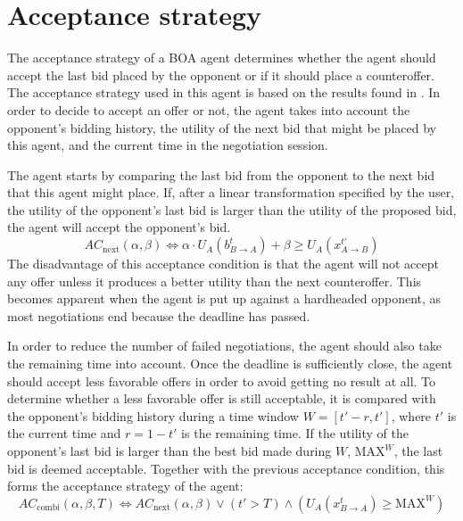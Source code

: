 \section{Acceptance strategy}

%
%
%

The acceptance strategy of a BOA agent determines whether the agent should accept the last bid placed by the opponent or if it should place a counteroffer.
The acceptance strategy used in this agent is based on the results found in \cite{ASarticle}.
In order to decide to accept an offer or not, the agent takes into account the opponent's bidding history, the utility of the next bid that might be placed by this agent, and the current time in the negotiation session.

The agent starts by comparing the last bid from the opponent to the next bid that this agent might place.
If, after a linear transformation specified by the user, the utility of the opponent's last bid is larger than the utility of the proposed bid, the agent will accept the opponent's bid.
$$
AC_\mathrm{next}(\alpha,\beta) \Leftrightarrow \alpha \cdot U_A(b^t_{B\rightarrow A}) + \beta \geq U_A(x^{t'}_{A\rightarrow B})
$$
The disadvantage of this acceptance condition is that the agent will not accept any offer unless it produces a better utility than the next counteroffer.
This becomes apparent when the agent is put up against a hardheaded opponent, as most negotiations end because the deadline has passed.

In order to reduce the number of failed negotiations, the agent should also take the remaining time into account.
Once the deadline is sufficiently close, the agent should accept less favorable offers in order to avoid getting no result at all.
To determine whether a less favorable offer is still acceptable, it is compared with the opponent's bidding history during a time window $W=[t'-r, t']$, where $t'$ is the current time and $r=1-t'$ is the remaining time.
If the utility of the opponent's last bid is larger than the best bid made during $W$, $\mathrm{MAX}^W$, the last bid is deemed acceptable.
Together with the previous acceptance condition, this forms the acceptance strategy of the agent:
$$
AC_\mathrm{combi}(\alpha,\beta,T) \Leftrightarrow AC_\mathrm{next}(\alpha,\beta) \vee (t' > T) \wedge ( U_A(x^t_{B\rightarrow A}) \geq \mathrm{MAX}^W)
$$